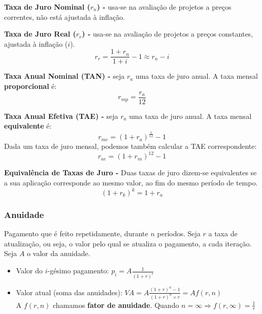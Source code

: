 \documentclass[11pt]{article}
\begin{document}
\textbf{Taxa de Juro Nominal ($r_n$) -} usa-se na avaliação de projetos a preços correntes, não está ajustada à inflação.

\textbf{Taxa de Juro Real ($r_r$) -} usa-se na avaliação de projetos a preços constantes, ajustada à inflação ($i$).
\begin{equation*}
    r_r = \frac{1+r_n}{1+i} - 1 \approx r_n - i
\end{equation*}

\textbf{Taxa Anual Nominal (TAN) -} seja $r_a$ uma taxa de juro anual. A taxa mensal \textbf{proporcional} é:
\begin{equation*}
    r_{mp} = \frac{r_a}{12}
\end{equation*}

\textbf{Taxa Anual Efetiva (TAE) -} seja $r_a$ uma taxa de juro anual. A taxa mensal \textbf{equivalente} é:
\begin{equation*}
    \displaystyle r_{me} = (1+r_a)^{\frac{1}{12}} - 1
\end{equation*}
Dada um taxa de juro mensal, podemos também calcular a TAE correspondente:
\begin{equation*}
    \displaystyle r_{ae} = (1+r_m)^{12} - 1
\end{equation*}

\textbf{Equivalência de Taxas de Juro -} Duas taxas de juro dizem-se equivalentes se a sua aplicação corresponde ao mesmo valor, ao fim do mesmo período de tempo.
\begin{equation*}
    (1+r_k)^k = 1 + r_a
\end{equation*}

\subsubsection{Anuidade}

Pagamento que é feito repetidamente, durante $n$ períodos. Seja $r$ a taxa de atualização, ou seja, o valor pelo qual se atualiza o pagamento, a cada iteração. Seja $A$ o valor da anuidade.
\begin{itemize}[topsep=0pt]
    \item Valor do $i$-gésimo pagamento: $\displaystyle p_i=A\frac{1}{(1+r)^i}$
    \item Valor atual (soma das anuidades): $\displaystyle VA=A\frac{(1+r)^n-1}{(1+r)^n\times r}=Af(r,n)$\\[6pt]
          A $f(r,n)$ chamamos \textbf{fator de anuidade}. Quando $\displaystyle n = \infty \Rightarrow f(r,\infty)=\frac{1}{r}$
\end{itemize}
\end{document}
